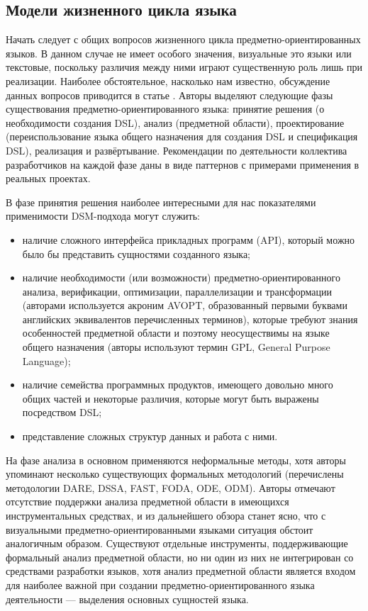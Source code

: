 \subsection{Модели жизненного цикла языка}
\label{lifecycleModels}
Начать следует с общих вопросов жизненного цикла предметно-ориентированных языков.
В данном случае не имеет особого значения, визуальные это языки или текстовые, поскольку
различия между ними играют существенную роль лишь при реализации. Наиболее обстоятельное,
насколько нам известно, обсуждение данных вопросов приводится в статье \cite{mernik2005and}. 
Авторы выделяют следующие фазы существования предметно-ориентированного языка: принятие 
решения (о необходимости создания DSL), анализ (предметной области), проектирование 
(переиспользование языка общего назначения для создания DSL и спецификация DSL), реализация 
и развёртывание. Рекомендации по деятельности коллектива разработчиков на каждой фазе 
даны в виде паттернов с примерами применения в реальных проектах. 

В фазе принятия решения наиболее интересными для нас показателями применимости \ac{DSM}-подхода могут служить: 
\begin{itemize}
	\item наличие сложного интерфейса прикладных программ (API), который можно было 
		бы представить сущностями созданного языка;
	\item наличие необходимости (или возможности) предметно-ориентированного анализа, 
		верификации, оптимизации, параллелизации и трансформации (авторами используется 
		акроним AVOPT, образованный первыми буквами английских эквивалентов перечисленных 
		терминов), которые требуют знания особенностей предметной области и поэтому неосуществимы 
		на языке общего назначения (авторы используют термин GPL, General Purpose Language);
	\item наличие семейства программных продуктов, имеющего довольно много общих частей 
		и некоторые различия, которые могут быть выражены посредством DSL;
	\item представление сложных структур данных и работа с ними.
\end{itemize}

На фазе анализа в основном применяются неформальные методы, хотя авторы упоминают 
несколько существующих формальных методологий (перечислены методологии
DARE, DSSA, FAST, FODA, ODE, ODM). Авторы отмечают отсутствие поддержки анализа предметной 
области в имеющихся инструментальных средствах, и из дальнейшего обзора станет ясно, 
что с визуальными предметно-ориентированными языками ситуация обстоит аналогичным 
образом. Существуют отдельные инструменты, поддерживающие формальный анализ предметной 
области, но ни один из них не интегрирован со средствами разработки языков, хотя анализ 
предметной области является входом для наиболее важной при создании предметно-ориентированного 
языка деятельности --- выделения основных сущностей языка.

